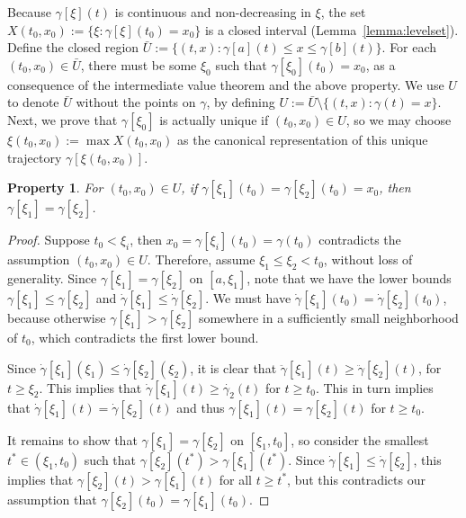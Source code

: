 \documentclass[a4paper]{article}
\theoremstyle{definition}
\theoremstyle{plain}
\newtheorem{property}{Property\hspace{0.25em}\ignorespaces}
\begin{document}
Because $\gamma[\xi](t)$ is continuous and non-decreasing in $\xi$, the set
$X(t_{0}, x_{0}) := \{\xi : \gamma[\xi](t_{0}) = x_{0}\}$ is a closed interval
(Lemma~\ref{lemma:levelset}).
%
Define the closed region
$\bar{U} := \{ (t, x) : \gamma[a](t) \leq x \leq \gamma[b](t) \}$. For each
$(t_{0}, x_{0}) \in \bar{U}$, there must be some $\xi_{0}$ such that
$\gamma[\xi_{0}](t_{0}) = x_{0}$, as a consequence of the intermediate value theorem
and the above property.
%
We use $U$ to denote $\bar{U}$ without the points on $\gamma$, by defining
$U := \bar{U} \setminus \{ (t,x) : \gamma(t) = x\}$. Next, we prove that $\gamma[\xi_{0}]$ is actually
unique if $(t_{0}, x_{0}) \in U$, so we may choose
$\xi(t_{0}, x_{0}) := \max X(t_{0}, x_{0})$ as the canonical
representation of this unique trajectory $\gamma[\xi(t_{0}, x_{0})]$.

\begin{property}\label{prop:xi-unique}
  For $(t_{0}, x_{0}) \in U$, if
  $\gamma[\xi_{1}](t_{0}) = \gamma[\xi_{2}](t_{0}) = x_{0}$, then
  $\gamma[\xi_{1}] = \gamma[\xi_{2}]$.
\end{property}
\begin{proof}
  Suppose $t_{0} < \xi_{i}$, then $x_{0} = \gamma[\xi_{i}](t_{0}) = \gamma(t_{0})$ contradicts the assumption $(t_{0}, x_{0}) \in U$.
  Therefore, assume $\xi_{1} \leq \xi_{2} < t_{0}$, without loss of generality.
  Since $\gamma[\xi_{1}] = \gamma[\xi_{2}]$ on $[a, \xi_{1}]$, note that
  we have the lower bounds $\gamma[\xi_{1}] \leq \gamma[\xi_{2}]$ and
  $\dot{\gamma}[\xi_{1}] \leq \dot{\gamma}[\xi_{2}]$.
  We must have $\dot{\gamma}[\xi_{1}](t_{0}) = \dot{\gamma}[\xi_{2}](t_{0})$,
  because otherwise $\gamma[\xi_{1}] > \gamma[\xi_{2}]$ somewhere in a
  sufficiently small neighborhood of $t_{0}$, which contradicts the first lower
  bound.

  Since $\dot{\gamma}[\xi_{1}](\xi_{1}) \leq \dot{\gamma}[\xi_{2}](\xi_{2})$, it
  is clear that $\ddot{\gamma}[\xi_{1}](t) \geq \ddot{\gamma}[\xi_{2}](t)$, for
  $t \geq \xi_{2}$. This implies that
  $\dot{\gamma}[\xi_{1}](t) \geq \dot{\gamma_{2}}(t)$ for $t \geq t_{0}$. This
  in turn implies that $\dot{\gamma}[\xi_{1}](t) = \dot{\gamma}[\xi_{2}](t)$ and
  thus $\gamma[\xi_{1}](t) = \gamma[\xi_{2}](t)$ for $t \geq t_{0}$.

  It remains to show that $\gamma[\xi_{1}] = \gamma[\xi_{2}]$ on $[\xi_{1}, t_{0}]$, so consider the smallest
  $t^{*} \in (\xi_{1}, t_{0})$ such that $\gamma[\xi_{2}](t^{*}) > \gamma[\xi_{1}](t^{*})$.
  Since $\dot{\gamma}[\xi_{1}] \leq \dot{\gamma}[\xi_{2}]$, this implies that $\gamma[\xi_{2}](t) > \gamma[\xi_{1}](t)$ for
  all $t \geq t^{*}$, but this contradicts our assumption that
  $\gamma[\xi_{2}](t_{0}) = \gamma[\xi_{1}](t_{0})$.
\end{proof}
\end{document}
